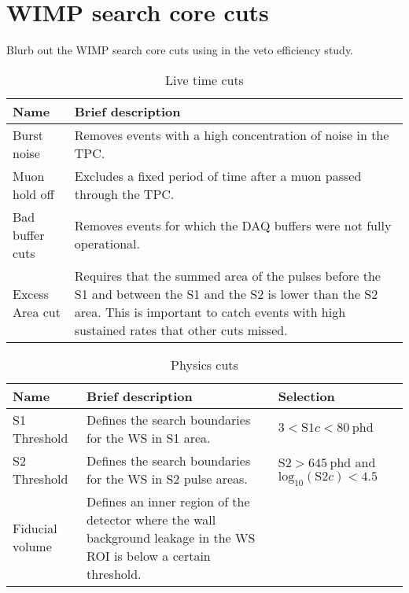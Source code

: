 \section{WIMP search core cuts}\label{sec:app/WSCoreCuts}
Blurb out the WIMP search core cuts using in the veto efficiency study.
\begin{table}[h!]
    \centering
    \caption{Live time cuts}
    \begin{tabular}{|m{10em}m{22em}|}
    \hline
    \textbf{Name} & \textbf{Brief description} \\
    \hline\hline
    Burst noise & Removes events with a high concentration of noise in the TPC.\\
    \hline
    Muon hold off & Excludes a fixed period of time after a muon passed through the TPC.\\
    \hline
    Bad buffer cuts & Removes events for which the DAQ buffers were not fully operational.\\
    \hline
    Excess Area cut & Requires that the summed area of the pulses before the S1 and between the S1 and the S2 is lower than the S2 area. This is important to catch events with high sustained rates that other cuts missed.\\
    \hline
    \end{tabular}
\end{table}

\begin{table}[h!]
    \centering
    \caption{Physics cuts}
    \begin{tabular}{|m{10em}m{12em}m{10em}|}
    \hline
    \textbf{Name} & \textbf{Brief description}& \textbf{Selection} \\
    \hline\hline
    S1 Threshold & Defines the search boundaries for the WS in S1 area. & $3<\text{S1}c<80~\text{phd}$ \\
    \hline
    S2 Threshold & Defines the search boundaries for the WS in S2 pulse areas. & $\text{S2}>645~\text{phd}$ and $\text{log}_{10}(\text{S2}c)<4.5$ \\
    \hline
    Fiducial volume & Defines an inner region of the detector where the wall background leakage in the WS ROI is below a certain threshold. & \\
    \hline
    \end{tabular}
\end{table}

